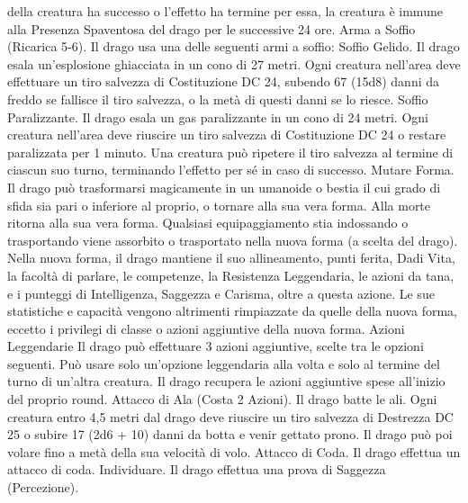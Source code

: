 \begin{multicols}{2}
della creatura ha successo o l’effetto ha termine per essa, la creatura è
immune alla Presenza Spaventosa del drago per le successive 24 ore.
Arma a Soffio (Ricarica 5-6). Il drago usa una delle seguenti armi
a soffio:
Soffio Gelido. Il drago esala un’esplosione ghiacciata in un cono di
27 metri. Ogni creatura nell’area deve effettuare un tiro salvezza di
Costituzione DC 24, subendo 67 (15d8) danni da freddo se fallisce il
tiro salvezza, o la metà di questi danni se lo riesce.
Soffio Paralizzante. Il drago esala un gas paralizzante in un cono di
24 metri. Ogni creatura nell’area deve riuscire un tiro salvezza di
Costituzione DC 24 o restare paralizzata per 1 minuto. Una creatura
può ripetere il tiro salvezza al termine di ciascun suo turno,
terminando l’effetto per sé in caso di successo.
Mutare Forma. Il drago può trasformarsi magicamente in un
umanoide o bestia il cui grado di sfida sia pari o inferiore al proprio,
o tornare alla sua vera forma. Alla morte ritorna alla sua vera forma.
Qualsiasi equipaggiamento stia indossando o trasportando viene
assorbito o trasportato nella nuova forma (a scelta del drago).
Nella nuova forma, il drago mantiene il suo allineamento, punti
ferita, Dadi Vita, la facoltà di parlare, le competenze, la Resistenza
Leggendaria, le azioni da tana, e i punteggi di Intelligenza, Saggezza
e Carisma, oltre a questa azione. Le sue statistiche e capacità
vengono altrimenti rimpiazzate da quelle della nuova forma, eccetto i
privilegi di classe o azioni aggiuntive della nuova forma.
Azioni Leggendarie
Il drago può effettuare 3 azioni aggiuntive, scelte tra le opzioni
seguenti. Può usare solo un’opzione leggendaria alla volta e solo
al termine del turno di un’altra creatura. Il drago recupera le
azioni aggiuntive spese all’inizio del proprio round.
Attacco di Ala (Costa 2 Azioni). Il drago batte le ali. Ogni
creatura entro 4,5 metri dal drago deve riuscire un tiro salvezza
di Destrezza DC 25 o subire 17 (2d6 + 10) danni da botta e
venir gettato prono. Il drago può poi volare fino a metà della sua
velocità di volo.
Attacco di Coda. Il drago effettua un attacco di coda.
Individuare. Il drago effettua una prova di Saggezza
(Percezione).
 

\end{multicols}
